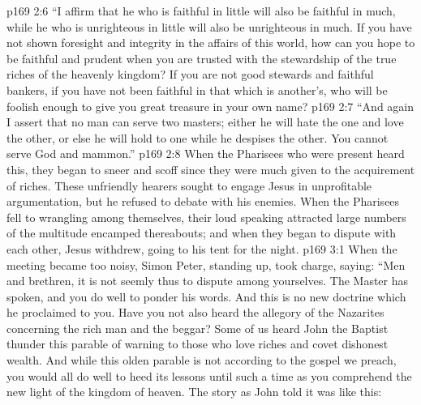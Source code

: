 \vs p169 2:6 \textcolor{ubdarkred}{“I affirm that he who is faithful in little will also be faithful in much, while he who is unrighteous in little will also be unrighteous in much. If you have not shown foresight and integrity in the affairs of this world, how can you hope to be faithful and prudent when you are trusted with the stewardship of the true riches of the heavenly kingdom? If you are not good stewards and faithful bankers, if you have not been faithful in that which is another’s, who will be foolish enough to give you great treasure in your own name?}
\vs p169 2:7 \textcolor{ubdarkred}{“And again I assert that no man can serve two masters; either he will hate the one and love the other, or else he will hold to one while he despises the other. You cannot serve God and mammon.”}
\pc \vs p169 2:8 When the Pharisees who were present heard this, they began to sneer and scoff since they were much given to the acquirement of riches. These unfriendly hearers sought to engage Jesus in unprofitable argumentation, but he refused to debate with his enemies. When the Pharisees fell to wrangling among themselves, their loud speaking attracted large numbers of the multitude encamped thereabouts; and when they began to dispute with each other, Jesus withdrew, going to his tent for the night.
\vs p169 3:1 When the meeting became too noisy, Simon Peter, standing up, took charge, saying: “Men and brethren, it is not seemly thus to dispute among yourselves. The Master has spoken, and you do well to ponder his words. And this is no new doctrine which he proclaimed to you. Have you not also heard the allegory of the Nazarites concerning the rich man and the beggar? Some of us heard John the Baptist thunder this parable of warning to those who love riches and covet dishonest wealth. And while this olden parable is not according to the gospel we preach, you would all do well to heed its lessons until such a time as you comprehend the new light of the kingdom of heaven. The story as John told it was like this:

